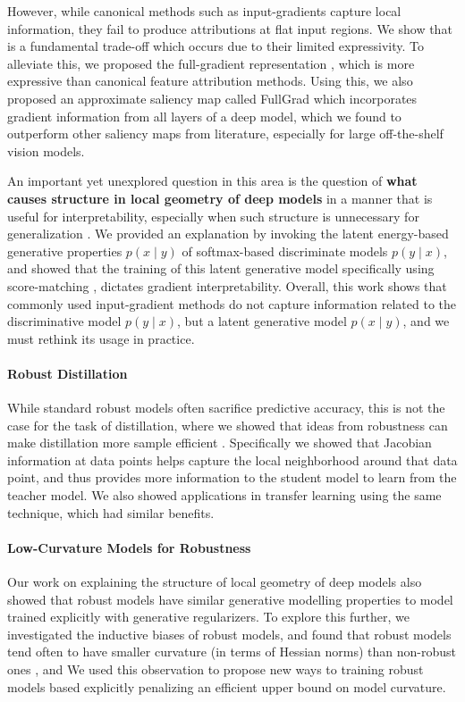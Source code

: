 \documentclass{article}
\renewcommand{\cite}{\citep}
\begin{document}
However, while canonical methods such as input-gradients capture local information, they fail to produce attributions at flat input regions. We show that is a fundamental trade-off which occurs due to their limited expressivity. To alleviate this, we proposed the full-gradient representation \cite{srinivas2019full}, which is more expressive than canonical feature attribution methods. Using this, we also proposed an approximate saliency map called FullGrad which incorporates gradient information from all layers of a deep model, which we found to outperform other saliency maps from literature, especially for large off-the-shelf vision models.  

An important yet unexplored question in this area is the question of \textbf{what causes structure in local geometry of deep models} in a manner that is useful for interpretability, especially when such structure is unnecessary for generalization \cite{srinivas2021rethinking}. We provided an explanation by invoking the latent energy-based generative properties $p(x \mid y)$ of softmax-based discriminate models $p(y \mid x)$, and showed that the training of this latent generative model specifically using score-matching \cite{hyvarinen2005estimation}, dictates gradient interpretability. Overall, this work shows that commonly used input-gradient methods do not capture information related to the discriminative model $p(y \mid x)$, but a latent generative model $p(x \mid y)$, and we must rethink its usage in practice. 

\paragraph*{Robust Distillation} While standard robust models often sacrifice predictive accuracy, this is not the case for the task of distillation, where we showed that ideas from robustness can make distillation more sample efficient \cite{srinivas2018knowledge}. Specifically we showed that Jacobian information at data points helps capture the local neighborhood around that data point, and thus provides more information to the student model to learn from the teacher model. We also showed applications in transfer learning using the same technique, which had similar benefits.

\paragraph*{Low-Curvature Models for Robustness} Our work on explaining the structure of local geometry of deep models \cite{srinivas2021rethinking} also showed that robust models have similar generative modelling properties to model trained explicitly with generative regularizers. To explore this further, 
we investigated the inductive biases of robust models, and found that robust models tend often to have smaller curvature (in terms of Hessian norms) than non-robust ones \cite{srinivas2022efficient}, and We used this observation to propose new ways to training robust models based explicitly penalizing an efficient upper bound on model curvature.
\end{document}
